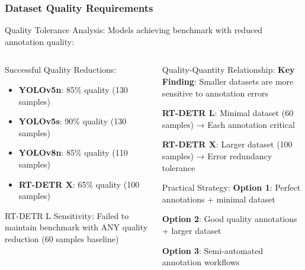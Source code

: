 \documentclass[aspectratio=43]{beamer}
\begin{document}
\begin{frame}
    \frametitle{Dataset Quality Requirements}
    
    \begin{block}{Quality Tolerance Analysis:}
        Models achieving benchmark with reduced annotation quality:
    \end{block}
    
    \begin{columns}
        \begin{column}{0.5\textwidth}
            \begin{exampleblock}{Successful Quality Reductions:}
                \small
                \begin{itemize}
                    \item \textbf{YOLOv5n}: 85\% quality (130 samples)
                    \item \textbf{YOLOv5s}: 90\% quality (130 samples)
                    \item \textbf{YOLOv8n}: 85\% quality (110 samples)
                    \item \textbf{RT-DETR X}: 65\% quality (100 samples)
                \end{itemize}
            \end{exampleblock}
            
            \begin{alertblock}{RT-DETR L Sensitivity:}
                \small Failed to maintain benchmark with ANY quality reduction (60 samples baseline)
            \end{alertblock}
        \end{column}
        
        \begin{column}{0.5\textwidth}
            \begin{block}{Quality-Quantity Relationship:}
                \small
                \textbf{Key Finding}: Smaller datasets are more sensitive to annotation errors
                
                \textbf{RT-DETR L}: Minimal dataset (60 samples) → Each annotation critical
                
                \textbf{RT-DETR X}: Larger dataset (100 samples) → Error redundancy tolerance
            \end{block}
            
            \begin{exampleblock}{Practical Strategy:}
                \scriptsize
                \textbf{Option 1}: Perfect annotations + minimal dataset
                
                \textbf{Option 2}: Good quality annotations + larger dataset
                
                \textbf{Option 3}: Semi-automated annotation workflows
            \end{exampleblock}
        \end{column}
    \end{columns}
\end{frame}
\end{document}
